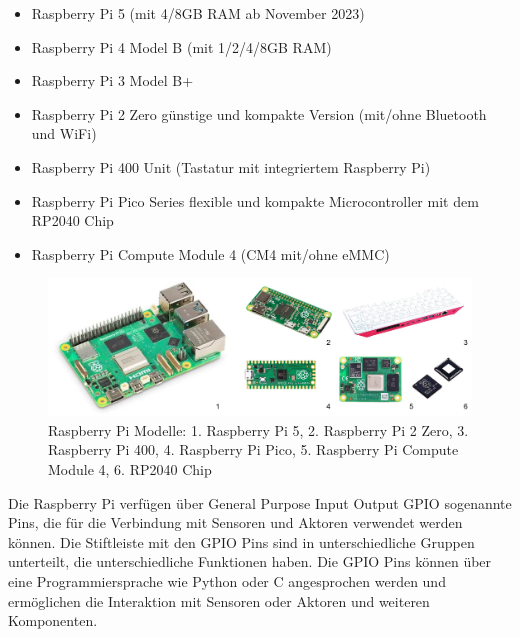 \documentclass[
  11pt,
  a4paperpaper,
  oneside, openany  ,captions=tableheading
]{scrbook}
\providecommand{\tightlist}{%
  \setlength{\itemsep}{0pt}\setlength{\parskip}{0pt}}
\theoremstyle{definition}
\theoremstyle{remark}
\begin{document}
\begin{itemize}
\tightlist
\item
  Raspberry Pi 5 (mit 4/8GB RAM ab November 2023)
\item
  Raspberry Pi 4 Model B (mit 1/2/4/8GB RAM)
\item
  Raspberry Pi 3 Model B+
\item
  Raspberry Pi 2 Zero günstige und kompakte Version (mit/ohne Bluetooth
  und WiFi)
\item
  Raspberry Pi 400 Unit (Tastatur mit integriertem Raspberry Pi)
\item
  Raspberry Pi Pico Series flexible und kompakte Microcontroller mit dem
  RP2040 Chip
\item
  Raspberry Pi Compute Module 4 (CM4 mit/ohne eMMC)
\end{itemize}

\begin{figure}[H]

{\centering \includegraphics{images/raspberry_pi_modelle.jpg}

}

\caption{Raspberry Pi Modelle: 1. Raspberry Pi 5, 2. Raspberry Pi 2
Zero, 3. Raspberry Pi 400, 4. Raspberry Pi Pico, 5. Raspberry Pi Compute
Module 4, 6. RP2040 Chip}

\end{figure}%

Die Raspberry Pi verfügen über General Purpose Input Output
GPIO sogenannte
Pins, die für die Verbindung mit Sensoren und Aktoren
verwendet werden können. Die Stiftleiste mit den GPIO Pins sind in
unterschiedliche Gruppen unterteilt, die unterschiedliche Funktionen
haben. Die GPIO Pins können über eine Programmiersprache wie Python oder
C angesprochen werden und ermöglichen die Interaktion mit Sensoren oder
Aktoren und weiteren Komponenten.
\end{document}
